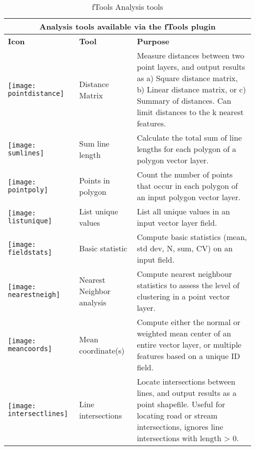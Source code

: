 \begin{table}[ht]
\centering
\caption{fTools Analysis tools}\label{tab:ftool_analysis}\medskip
 \begin{tabular}{|p{0.3in}|p{1.2in}|p{4.7in}|}
 \hline \multicolumn{3}{|c|}{\textbf{Analysis tools available via the fTools plugin}} \\
 \hline \textbf{Icon} & \textbf{Tool} & \textbf{Purpose} \\
 \hline \texttt{[image: pointdistance]} & Distance Matrix &
Measure distances between two point layers, and output results as a) Square
distance matrix, b) Linear distance matrix, or c) Summary of distances. Can
limit distances to the k nearest features. \\ 
 \hline \texttt{[image: sumlines]} & Sum line length & Calculate
the total sum of line lengths for each polygon of a polygon vector layer. \\
 \hline \texttt{[image: pointpoly]} & Points in polygon & Count
the number of points that occur in each polygon of an input polygon vector
layer. \\
 \hline \texttt{[image: listunique]} & List unique values & List
all unique values in an input vector layer field. \\
 \hline \texttt{[image: fieldstats]} & Basic statistic & Compute
basic statistics (mean, std dev, N, sum, CV) on an input field. \\ 
 \hline \texttt{[image: nearestneigh]} & Nearest Neighbor analysis
& Compute nearest neighbour statistics to assess the level of clustering in a
point vector layer. \\
 \hline \texttt{[image: meancoords]} & Mean coordinate(s) &
Compute either the normal or weighted mean center of an entire vector layer,
or multiple features based on a unique ID field. \\ 
 \hline \texttt{[image: intersectlines]} & Line intersections &
Locate intersections between lines, and output results as a point shapefile.
Useful for locating road or stream intersections, ignores line intersections
with length > 0. \\
 \hline
\end{tabular}
\end{table}

